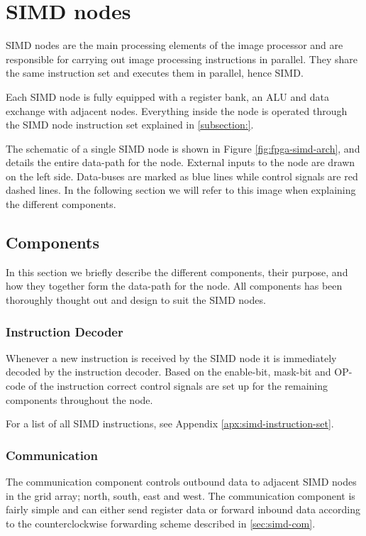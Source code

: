 \section{SIMD nodes}

\ac{SIMD} nodes are the main processing elements of the image processor and are
responsible for carrying out image processing instructions in parallel. They
share the same instruction set and executes them in parallel, hence
\acf{SIMD}.

Each \ac{SIMD} node is fully equipped with a register bank,
an \ac{ALU} and data exchange with adjacent nodes.
Everything inside the node is operated through the SIMD node
instruction set explained in \ref{subsection:}.

The schematic of a single \ac{SIMD} node is shown in Figure
\ref{fig:fpga-simd-arch}, and details the entire data-path for the
node. External inputs to the node are drawn on the left side. Data-buses are 
marked as blue lines while control signals are red dashed lines. In the 
following section we will refer to this image when explaining the different 
components.



\subsection{Components}
In this section we briefly describe the different components, their purpose, and
how they together form the data-path for the node. All components has been thoroughly
thought out and design to suit the \ac{SIMD} nodes.  

\subsubsection{Instruction Decoder}
Whenever a new instruction is received by the \ac{SIMD} node it is immediately 
decoded by the instruction decoder. Based on the enable-bit, mask-bit and OP-code
of the instruction correct control signals are set up for the remaining components
throughout the node.

For a list of all \ac{SIMD} instructions, see Appendix \ref{apx:simd-instruction-set}.

\subsubsection{Communication}
The communication component controls outbound data to adjacent \ac{SIMD} nodes in 
the grid array; north, south, east and west. The communication component is fairly 
simple and can either send register data or forward inbound data according to the 
counterclockwise forwarding scheme described in \ref{sec:simd-com}.

